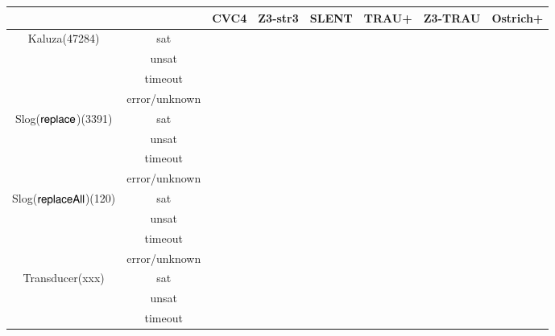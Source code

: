 \begin{table}[htbp]
\begin{center}
\begin{tabular}{|c|c|c|c|c|c|c|c|}
\hline
& &  CVC4 & Z3-str3 & SLENT & TRAU+ & Z3-TRAU & Ostrich+\\
\hline
\multirow{4}{*}{Kaluza(47284)} & \cellcolor{Gray} sat & \cellcolor{Gray} & \cellcolor{Gray} & \cellcolor{Gray} & \cellcolor{Gray} & \cellcolor{Gray} & \cellcolor{Gray}\\
\cline{2-8}
 & unsat &  &  &  &  & &\\
\cline{2-8}
 & \cellcolor{Gray}  timeout & \cellcolor{Gray} & \cellcolor{Gray} & \cellcolor{Gray} & \cellcolor{Gray} &\cellcolor{Gray} &\cellcolor{Gray} \\
\cline{2-8}
 & error/unknown &  &  &  &  & &\\
\hline
\multirow{4}{*}{Slog($\mathsf{replace}$)(3391)} & \cellcolor{Gray} sat & \cellcolor{Gray} & \cellcolor{Gray} & \cellcolor{Gray} & \cellcolor{Gray} & \cellcolor{Gray} & \cellcolor{Gray} \\
\cline{2-8}
 & unsat &  &  &  &  & &\\
\cline{2-8}
 & \cellcolor{Gray}  timeout & \cellcolor{Gray} & \cellcolor{Gray} & \cellcolor{Gray} & \cellcolor{Gray} &\cellcolor{Gray} &\cellcolor{Gray} \\
\cline{2-8}
 & error/unknown &  &  &  &  & &\\
\hline
\multirow{4}{*}{Slog($\mathsf{replaceAll}$)(120)} & \cellcolor{Gray} sat & \cellcolor{Gray} & \cellcolor{Gray} & \cellcolor{Gray} & \cellcolor{Gray} & \cellcolor{Gray} & \cellcolor{Gray}\\
\cline{2-8}
 & unsat &  &  &  &  & &\\
\cline{2-8}
 & \cellcolor{Gray}  timeout & \cellcolor{Gray} & \cellcolor{Gray} & \cellcolor{Gray} & \cellcolor{Gray} &\cellcolor{Gray} &\cellcolor{Gray} \\
\cline{2-8}
 & error/unknown &  &  &  &  & &\\
\hline
\multirow{4}{*}{Transducer(xxx)} & \cellcolor{Gray} sat & \cellcolor{Gray} & \cellcolor{Gray} & \cellcolor{Gray} & \cellcolor{Gray} & \cellcolor{Gray} & \cellcolor{Gray}\\
\cline{2-8}
 & unsat &  &  &  &  & &\\
\cline{2-8}
 & \cellcolor{Gray}  timeout & \cellcolor{Gray} & \cellcolor{Gray} & \cellcolor{Gray} & \cellcolor{Gray} &\cellcolor{Gray} &\cellcolor{Gray} \\

\end{tabular}
\end{center}
\end{table}
